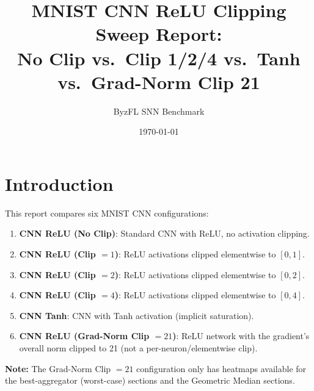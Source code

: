 \documentclass{article}
\title{MNIST CNN ReLU Clipping Sweep Report:\\No Clip vs.\ Clip 1/2/4 vs.\ Tanh vs.\ Grad-Norm Clip 21}
\author{ByzFL SNN Benchmark}
\date{\today}
\begin{document}
\maketitle

\clearpage
\tableofcontents
\clearpage

\section{Introduction}
This report compares six MNIST CNN configurations:
\begin{enumerate}
    \item \textbf{CNN ReLU (No Clip)}: Standard CNN with ReLU, no activation clipping.
    \item \textbf{CNN ReLU (Clip $=1$)}: ReLU activations clipped elementwise to $[0, 1]$.
    \item \textbf{CNN ReLU (Clip $=2$)}: ReLU activations clipped elementwise to $[0, 2]$.
    \item \textbf{CNN ReLU (Clip $=4$)}: ReLU activations clipped elementwise to $[0, 4]$.
    \item \textbf{CNN Tanh}: CNN with Tanh activation (implicit saturation).
    \item \textbf{CNN ReLU (Grad-Norm Clip $=21$)}: ReLU network with the gradient's overall norm clipped to 21 (not a per-neuron/elementwise clip).
\end{enumerate}

\textbf{Note:} The Grad-Norm Clip $=21$ configuration only has heatmaps available for the best-aggregator (worst-case) sections and the Geometric Median sections.

\clearpage
\end{document}
